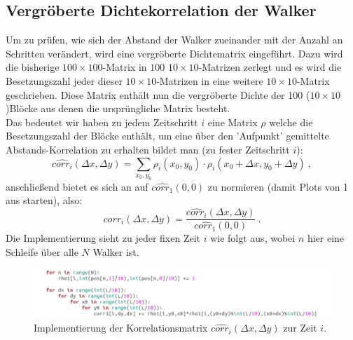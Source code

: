 \documentclass[a4paper, 12pt]{scrartcl}
\begin{document}
\subsection{Vergröberte Dichtekorrelation der Walker}
\noindent Um zu prüfen, wie sich der Abstand der Walker zueinander mit der Anzahl an Schritten verändert, wird eine vergröberte Dichtematrix eingeführt. Dazu wird die bisherige \newline $100\times 100$-Matrix in $100$ $10\times 10$-Matrizen zerlegt und es wird die Besetzungszahl jeder dieser $10\times 10$-Matrizen in eine weitere $10\times 10$-Matrix geschrieben. Diese Matrix enthält nun die vergröberte Dichte der 100 ($10\times 10$)Blöcke aus denen die ursprüngliche Matrix besteht. 
\\
\noindent Das bedeutet wir haben zu jedem Zeitschritt $i$ eine Matrix $\rho$ welche die Besetzungszahl der Blöcke enthält, um eine über den 'Aufpunkt' gemittelte Abstands-Korrelation zu erhalten bildet man (zu fester Zeitschritt $i$):
\begin{equation}
\hat{corr_i}(\Delta x,\Delta y) = \sum_{x_0,y_0}\rho_i(x_0,y_0)\cdot\rho_i(x_0+\Delta x,y_0+\Delta y)\ ,
\end{equation}
anschließend bietet es sich an auf $\hat{corr_1}(0,0)$ zu normieren (damit Plots von 1 aus starten), also:
\begin{equation}
corr_i(\Delta x,\Delta y) = \frac{ \hat{corr_i}(\Delta x,\Delta y) }{ \hat{corr_1}(0,0) } \ .
\end{equation}
Die Implementierung sieht zu jeder fixen Zeit $i$ wie folgt aus, wobei $n$ hier eine Schleife über alle $N$ Walker ist.
\vspace{0.3cm}
\begin{figure}[h!]
	\centering
	\includegraphics[scale=0.7]{corrcode.png}
	\caption{Implementierung der Korrelationsmatrix $\hat{corr_i}(\Delta x,\Delta y)$ zur Zeit $i$.}
\end{figure}

\newpage
\end{document}
